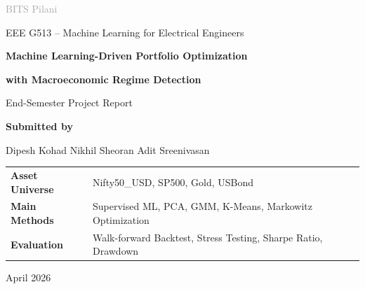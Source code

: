 \documentclass[11pt,a4paper]{article}
\newcommand{\reporttitle}{Machine Learning-Driven Portfolio Optimization}
\newcommand{\reportsubtitle}{with Macroeconomic Regime Detection}
\newcommand{\coursename}{EEE G513 -- Machine Learning for Electrical Engineers}
\newcommand{\teamnames}{Dipesh Kohad \quad Nikhil Sheoran \quad Adit Sreenivasan}
\begin{document}
\begin{titlepage}
    \centering
    \vspace*{1.2cm}
    {\Large \textcolor{darkgray}{BITS Pilani}\par}
    \vspace{0.4cm}
    {\large \coursename\par}
    \vspace{2.2cm}
    {\Huge \bfseries \textcolor{bitsblue}{\reporttitle}\par}
    \vspace{0.25cm}
    {\LARGE \bfseries \reportsubtitle\par}
    \vspace{1.4cm}
    {\large End-Semester Project Report\par}
    \vspace{2.0cm}
    {\large \textbf{Submitted by}\par}
    \vspace{0.35cm}
    {\large \teamnames\par}
    \vfill
    \begin{tabular}{>{\bfseries}ll}
        Asset Universe & Nifty50\_USD, SP500, Gold, USBond \\
        Main Methods & Supervised ML, PCA, GMM, K-Means, Markowitz Optimization \\
        Evaluation & Walk-forward Backtest, Stress Testing, Sharpe Ratio, Drawdown \\
    \end{tabular}
    \vfill
    {\large April 2026\par}
\end{titlepage}

\tableofcontents
\newpage
{}

\begin{abstract}
This project studies whether machine learning based return prediction and macroeconomic regime detection can improve portfolio allocation across multiple asset classes. We use four investable asset proxies: Nifty50 in USD terms, S\&P 500, Gold, and US Bonds. The pipeline combines asset-level exploratory analysis, supervised monthly return prediction, unsupervised macroeconomic regime detection, constrained Markowitz mean-variance optimization, walk-forward backtesting, and stress-period evaluation. The final results show that the ML-driven Markowitz strategy achieves the best risk-adjusted performance among the tested strategies, with an annualized return of 9.49\%, Sharpe ratio of 1.00, and maximum drawdown of -16.35\%.
\end{abstract}
\end{document}
